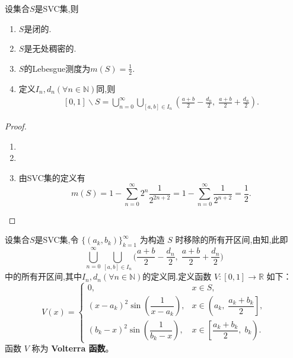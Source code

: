 \documentclass[../../main.tex]{subfiles}%
\begin{document}
\begin{theorem}\label{theorem:SVC集的基本性质}
设集合$S$是SVC集,则
\begin{enumerate}[(1)]
\item $S$是闭的.

\item $S$是无处稠密的.

\item $S$的Lebesgue测度为$m(S)=\frac{1}{2}$.

\item\label{theorem:SVC集的基本性质-4} 定义$I_n,d_n(\forall n\in \mathbb{N})$同,则
\begin{align*}
\left[ 0,1 \right] \backslash S=\bigcup_{n=0}^{\infty}{\bigcup_{\left[ a,b \right] \in I_n}{\left( \frac{a+b}{2}-\frac{d_n}{2},\;\frac{a+b}{2}+\frac{d_n}{2} \right)}}.
\end{align*}
\end{enumerate}
\end{theorem}
\begin{proof}
\begin{enumerate}[(1)]
\item 

\item 

\item 由SVC集的定义有
\[
m(S) = 1 - \sum_{n=0}^{\infty} 2^n \frac{1}{2^{2n+2}} = 1 - \sum_{n=0}^{\infty} \frac{1}{2^{n+2}} = \frac{1}{2}.
\]
\end{enumerate}
\end{proof}

\begin{definition}\label{definition:Volterra(沃尔泰拉)函数}
设集合$S$是SVC集,令 \( \{ (a_k, b_k) \}_{k=1}^{\infty} \) 为构造 \( S \) 时移除的所有开区间,由知,此即
\[ 
\bigcup_{n=0}^{\infty} \bigcup_{[a,b] \in I_n} \bigl( \frac{a+b}{2} - \frac{d_n}{2},\; \frac{a+b}{2} + \frac{d_n}{2} \bigr) 
\]中的所有开区间,其中$I_n,d_n(\forall n\in \mathbb{N})$的定义同.定义函数 \( V : [0,1] \to \mathbb{R} \) 如下：
\[
V(x) =
\begin{cases}
0, & x \in S, \\[6pt]
(x - a_k)^2 \sin\!\left(\dfrac{1}{x - a_k}\right), & x \in \left(a_k,\; \dfrac{a_k+b_k}{2}\right], \\[10pt]
(b_k - x)^2 \sin\!\left(\dfrac{1}{b_k - x}\right), & x \in \left[\dfrac{a_k+b_k}{2},\; b_k\right).
\end{cases}
\]
函数 \( V \) 称为 \textbf{Volterra 函数}。
\end{definition}
\end{document}
